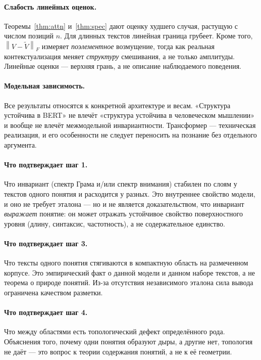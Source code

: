 \documentclass[11pt,a4paper]{article}
\theoremstyle{definition}
\theoremstyle{plain}
\newcommand{\norm}[1]{\left\lVert #1 \right\rVert}
\begin{document}
\paragraph{Слабость линейных оценок.} Теоремы~\ref{thm:attn} и~\ref{thm:spec} дают оценку
худшего случая, растущую с числом позиций $n$. Для длинных текстов линейная граница грубеет.
Кроме того, $\norm{V-\tilde V}_F$ измеряет \emph{поэлементное} возмущение, тогда как реальная
контекстуализация меняет \emph{структуру} смешивания, а не только амплитуды. Линейные оценки —
верхняя грань, а не описание наблюдаемого поведения.

\paragraph{Модельная зависимость.} Все результаты относятся к конкретной архитектуре и весам.
«Структура устойчива в BERT» не влечёт «структура устойчива в человеческом мышлении» и вообще
не влечёт межмодельной инвариантности. Трансформер — техническая реализация, и его особенности
не следует переносить на познание без отдельного аргумента.

\paragraph{Что подтверждает шаг 1.} Что инвариант (спектр Грама и/или спектр внимания)
стабилен по слоям у текстов одного понятия и расходится у разных. Это внутреннее свойство
модели, и оно не требует эталона — но и не является доказательством, что инвариант
\emph{выражает} понятие: он может отражать устойчивое свойство поверхностного уровня
(длину, синтаксис, частотность), а не содержательное единство.

\paragraph{Что подтверждает шаг 3.} Что тексты одного понятия стягиваются в компактную
область на размеченном корпусе. Это эмпирический факт о данной модели и данном наборе текстов,
а не теорема о природе понятий. Из-за отсутствия независимого эталона сила вывода ограничена
качеством разметки.

\paragraph{Что подтверждает шаг 4.} Что между областями есть топологический дефект
определённого рода. Объяснения того, почему одни понятия образуют дыры, а другие нет, топология
не даёт — это вопрос к теории содержания понятий, а не к её геометрии.
\end{document}

